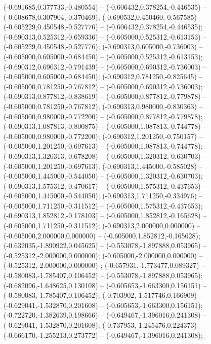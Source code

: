  (-0.691685,0.377733,-0.480554) -- (-0.606432,0.378254,-0.446535) -- (-0.608678,0.307904,-0.370469);
 (-0.690532,0.450460,-0.567585) -- (-0.605229,0.450548,-0.527776) -- (-0.606432,0.378254,-0.446535);
 (-0.690313,0.525312,-0.659336) -- (-0.605000,0.525312,-0.613153) -- (-0.605229,0.450548,-0.527776);
 (-0.690313,0.605000,-0.736003) -- (-0.605000,0.605000,-0.684450) -- (-0.605000,0.525312,-0.613153);
 (-0.690312,0.690312,-0.791439) -- (-0.605000,0.690312,-0.736003) -- (-0.605000,0.605000,-0.684450);
 (-0.690312,0.781250,-0.825645) -- (-0.605000,0.781250,-0.767812) -- (-0.605000,0.690312,-0.736003);
 (-0.690313,0.877812,-0.838619) -- (-0.605000,0.877812,-0.779878) -- (-0.605000,0.781250,-0.767812);
 (-0.690313,0.980000,-0.830363) -- (-0.605000,0.980000,-0.772200) -- (-0.605000,0.877812,-0.779878);
 (-0.690313,1.087813,-0.800875) -- (-0.605000,1.087813,-0.744778) -- (-0.605000,0.980000,-0.772200);
 (-0.690312,1.201250,-0.750157) -- (-0.605000,1.201250,-0.697613) -- (-0.605000,1.087813,-0.744778);
 (-0.690313,1.320313,-0.678208) -- (-0.605000,1.320312,-0.630703) -- (-0.605000,1.201250,-0.697613);
 (-0.690313,1.445000,-0.585028) -- (-0.605000,1.445000,-0.544050) -- (-0.605000,1.320312,-0.630703);
 (-0.690313,1.575312,-0.470617) -- (-0.605000,1.575312,-0.437653) -- (-0.605000,1.445000,-0.544050);
 (-0.690313,1.711250,-0.334976) -- (-0.605000,1.711250,-0.311512) -- (-0.605000,1.575312,-0.437653);
 (-0.690313,1.852812,-0.178103) -- (-0.605000,1.852812,-0.165628) -- (-0.605000,1.711250,-0.311512);
 (-0.690313,2.000000,0.000000) -- (-0.605000,2.000000,0.000000) -- (-0.605000,1.852812,-0.165628);
 (-0.632035,-1.890922,0.045625) -- (-0.553078,-1.897888,0.053965) -- (-0.525312,-2.000000,0.000000);
 (-0.605000,-2.000000,0.000000) -- (-0.525312,-2.000000,0.000000) ;
 (-0.657931,-1.773477,0.089327) -- (-0.580083,-1.785407,0.106452) -- (-0.553078,-1.897888,0.053965);
 (-0.682096,-1.648625,0.130108) -- (-0.605653,-1.663300,0.156151) -- (-0.580083,-1.785407,0.106452);
 (-0.703902,-1.517746,0.166909) -- (-0.629041,-1.532870,0.201608) -- (-0.605653,-1.663300,0.156151);
 (-0.722720,-1.382639,0.198666) -- (-0.649467,-1.396016,0.241308) -- (-0.629041,-1.532870,0.201608);
 (-0.737953,-1.245476,0.224373) -- (-0.666170,-1.255213,0.273772) -- (-0.649467,-1.396016,0.241308);
